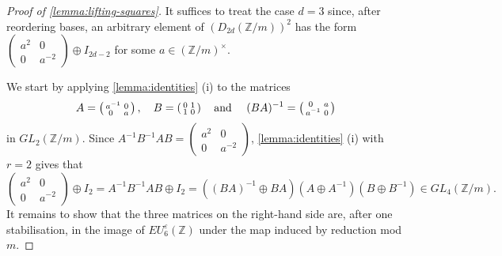 \documentclass[11pt,a4paper,leqno]{amsart}
\theoremstyle{definition}
\theoremstyle{remark}
\newcommand{\cy}[1]{\Z/{#1}}
\newcommand{\Z}{\mathbb{Z}}
\newcommand{\bZ}{\mathbb Z}
\newcommand{\ep}{\varepsilon}
\newcommand{\sx}{\hphantom{x}}
\begin{document}
\begin{proof}[Proof of \cref{lemma:lifting-squares}]
It suffices to treat the case $d=3$ since, after reordering bases, an arbitrary element of $(D_{2d}(\Z/m))^2$ has the form $\left(\begin{smallmatrix}a^2 & 0 \\ 0 & a^{-2} \end{smallmatrix}\right) \oplus I_{2d-2}$ for some $a \in (\Z/m)^\times$. 

We start by applying \cref{lemma:identities} (i)  to the matrices 
$$A = \left(\begin{smallmatrix}a^{-1} & 0 \\ 0\sx & a \end{smallmatrix}\right),  \quad B = \left(\begin{smallmatrix} 0 & 1 \\ 1 & 0 \end{smallmatrix}\right) \quad \text{and\ } \quad (BA)^{-1} = \left(\begin{smallmatrix}0 \sx& a \\ a^{-1} & 0 \end{smallmatrix}\right)$$  
in $GL_2(\Z/m)$. Since
$A^{-1}B^{-1}AB  = \left(\begin{smallmatrix}a^2 & 0 \\ 0 & a^{-2} \end{smallmatrix}\right)$, \cref{lemma:identities} (i) with $r=2$ gives that
$$ \left(\begin{smallmatrix}a^2 & 0 \\ 0 & a^{-2} \end{smallmatrix}\right) \oplus I_2 = A^{-1}B^{-1}AB \oplus I_2 =
((BA)^{-1} \oplus BA)(A \oplus A^{-1})(B\oplus B^{-1})  \in GL_4(\cy m).$$
It remains to show that the three matrices on the right-hand side are, after one stabilisation, in the image of  $EU^\ep_{6}(\bZ)$ under the map induced by reduction mod $m$. 


\end{proof}
\end{document}
